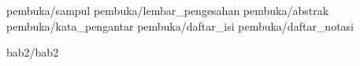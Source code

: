 \documentclass[a5paper, twoside, 11pt, listof=nochaptergap, bahasa] {book}
\begin{document}
\begin{sloppypar}
	
	\pagestyle {normal}
	
	\frontmatter
		 {pembuka/sampul}
		 {pembuka/lembar_pengesahan}
		 {pembuka/abstrak}
		 {pembuka/kata_pengantar}
		 {pembuka/daftar_isi}
		 {pembuka/daftar_notasi}
	
	\mainmatter
		 {bab2/bab2} \cleardoublepage
	
		
\end{sloppypar}
\end{document}
